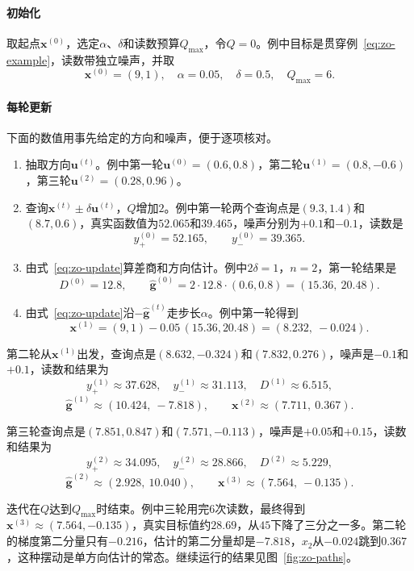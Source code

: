 \paragraph{初始化}
取起点$\bm{x}^{(0)}$，选定$\alpha$、$\delta$和读数预算$Q_{\max}$，令$Q=0$。例中目标是贯穿例~\eqref{eq:zo-example}，读数带独立噪声，并取
\[
 \bm{x}^{(0)}=(9,1),\quad\alpha=0.05,\quad\delta=0.5,\quad Q_{\max}=6.
\]

\paragraph{每轮更新}
下面的数值用事先给定的方向和噪声，便于逐项核对。
\begin{enumerate}
 \item 抽取方向$\bm{u}^{(t)}$。例中第一轮$\bm{u}^{(0)}=(0.6,0.8)$，第二轮$\bm{u}^{(1)}=(0.8,-0.6)$，第三轮$\bm{u}^{(2)}=(0.28,0.96)$。
 \item 查询$\bm{x}^{(t)}\pm\delta\bm{u}^{(t)}$，$Q$增加$2$。例中第一轮两个查询点是$(9.3,1.4)$和$(8.7,0.6)$，真实函数值为$52.065$和$39.465$，噪声分别为$+0.1$和$-0.1$，读数是
 \[
  y_+^{(0)}=52.165,\qquad y_-^{(0)}=39.365.
 \]
 \item 由式~\eqref{eq:zo-update}算差商和方向估计。例中$2\delta=1$，$n=2$，第一轮结果是
 \[
  D^{(0)}=12.8,\qquad\hat{\bm{g}}^{(0)}=2\cdot12.8\cdot(0.6,0.8)=(15.36,\ 20.48).
 \]
 \item 由式~\eqref{eq:zo-update}沿$-\hat{\bm{g}}^{(t)}$走步长$\alpha$。例中第一轮得到
 \[
  \bm{x}^{(1)}=(9,1)-0.05\,(15.36,20.48)=(8.232,\ -0.024).
 \]
\end{enumerate}

第二轮从$\bm{x}^{(1)}$出发，查询点是$(8.632,-0.324)$和$(7.832,0.276)$，噪声是$-0.1$和$+0.1$，读数和结果为
\[
 y_+^{(1)}\approx37.628,\quad y_-^{(1)}\approx31.113,\quad D^{(1)}\approx6.515,
\]
\[
 \hat{\bm{g}}^{(1)}\approx(10.424,\ -7.818),\qquad\bm{x}^{(2)}\approx(7.711,\ 0.367).
\]

第三轮查询点是$(7.851,0.847)$和$(7.571,-0.113)$，噪声是$+0.05$和$+0.15$，读数和结果为
\[
 y_+^{(2)}\approx34.095,\quad y_-^{(2)}\approx28.866,\quad D^{(2)}\approx5.229,
\]
\[
 \hat{\bm{g}}^{(2)}\approx(2.928,\ 10.040),\qquad\bm{x}^{(3)}\approx(7.564,\ -0.135).
\]

迭代在$Q$达到$Q_{\max}$时结束。例中三轮用完$6$次读数，最终得到$\bm{x}^{(3)}\approx(7.564,-0.135)$，真实目标值约$28.69$，从$45$下降了三分之一多。第二轮的梯度第二分量只有$-0.216$，估计的第二分量却是$-7.818$，$x_2$从$-0.024$跳到$0.367$，这种摆动是单方向估计的常态。继续运行的结果见图~\ref{fig:zo-paths}。

